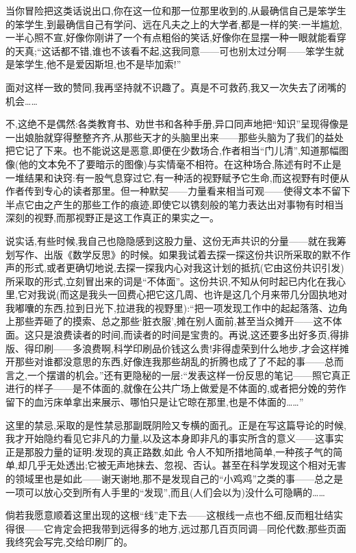当你冒险把这类话说出口,你在这一位和那一位那里收到的,从最确信自己是笨学生的笨学生,到最确信自己有学问、远在凡夫之上的大学者,都是一样的笑:一半尴尬,一半心照不宣,好像你刚讲了一个有点粗俗的笑话,好像你在显摆一种一眼就能看穿的天真;“这话都不错,谁也不该看不起,这我同意——可也别太过分啊——笨学生就是笨学生,他不是爱因斯坦,也不是毕加索!”

面对这样一致的赞同,我再坚持就不识趣了。真是不可救药,我又一次失去了闭嘴的机会……

不,这绝不是偶然:各类教育书、劝世书和各种手册,异口同声地把“知识”呈现得像是一出娘胎就穿得整整齐齐,从那些天才的头脑里出来——那些头脑为了我们的益处把它记了下来。也不能说这是恶意,即便在少数场合,作者相当“门儿清”,知道那幅图像(他的文本免不了要暗示的图像)与实情毫不相符。在这种场合,陈述有时不止是一堆结果和诀窍:有一股气息穿过它,有一种活的视野赋予它生命,而这视野有时便从作者传到专心的读者那里。但一种默契——力量看来相当可观——使得文本不留下半点它由之产生的那些工作的痕迹,即使它以镌刻般的笔力表达出对事物有时相当深刻的视野,而那视野正是这工作真正的果实之一。

 说实话,有些时候,我自己也隐隐感到这股力量、这份无声共识的分量——就在我筹划写作、出版《数学反思》的时候。如果我试着去探一探这份共识所采取的默不作声的形式,或者更确切地说,去探一探我内心对我这计划的抵抗(它由这份共识引发)所采取的形式,立刻冒出来的词是“不体面”。这份共识,不知从何时起已内化在我心里,它对我说(而这是我头一回费心把它这几周、也许是这几个月来带几分固执地对我嘟囔的东西,拉到日光下,拉进我的视野里):“把一项发现工作中的起起落落、边角上那些弄砸了的摸索、总之那些‘脏衣服’,摊在别人面前,甚至当众摊开——这不体面。这只是浪费读者的时间,而读者的时间是宝贵的。再说,这还要多出好多页,得排版、得印刷——多浪费啊,科学印刷品价钱这么贵!非得虚荣到什么地步,才会这样摊开那些对谁都没意思的东西,好像连我那些胡乱的折腾也成了了不起的事——总而言之,一个摆谱的机会。”还有更隐秘的一层:“发表这样一份反思的笔记——照它真正进行的样子——是不体面的,就像在公共广场上做爱是不体面的,或者把分娩的劳作留下的血污床单拿出来展示、哪怕只是让它晾在那里,也是不体面的……”

这里的禁忌,采取的是性禁忌那副既阴险又专横的面孔。正是在写这篇导论的时候,我才开始隐约看见它非凡的力量,以及这本身即非凡的事实所含的意义——这事实正是那股力量的证明:发现的真正路数,如此
令人不知所措地简单,一种孩子气的简单,却几乎无处透出;它被无声地抹去、忽视、否认。甚至在科学发现这个相对无害的领域里也是如此——谢天谢地,那不是发现自己的“小鸡鸡”之类的事——总之是一项可以放心交到所有人手里的“发现”,而且(人们会以为)没什么可隐瞒的……

倘若我愿意顺着这里出现的这根“线”走下去——这根线一点也不细,反而粗壮结实得很——它肯定会把我带到远得多的地方,远过那几百页同调—同伦代数;那些页面我终究会写完,交给印刷厂的。


